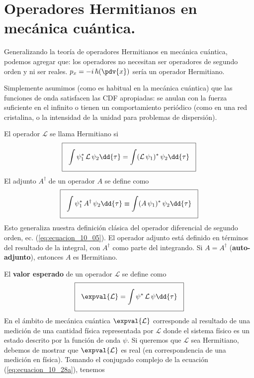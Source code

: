 \section{Operadores Hermitianos en mecánica cuántica.}
Generalizando la teoría de operadores Hermitianos en mecánica cuántica, podemos agregar que: los operadores no necesitan ser operadores de segundo orden y ni ser reales. $\displaystyle p_{x} = - i \, \hbar(\pdv{x})$ sería un operador Hermitiano.
\par
Simplemente asumimos (como es habitual en la mecánica cuántica) que las funciones de onda satisfacen las CDF apropiadas: se anulan con la fuerza suficiente en el infinito o tienen un comportamiento periódico (como en una red cristalina, o la intensidad de la unidad para problemas de dispersión). 
\par
El operador $\mathcal{L}$ se llama Hermitiano si
\begin{equation}
\setlength{\fboxsep}{3\fboxsep}\boxed{\int \psi_{1}^{*} \, \mathcal{L} \, \psi_{2} \dd{\tau} =  \int (\mathcal{L} \, \psi_{1})^{*} \, \psi_{2} \dd{\tau}}
\label{eq:ecuacion_10_26}
\end{equation}
El adjunto $A^{\dagger}$ de un operador $A$ se define como 
\begin{equation}
\setlength{\fboxsep}{3\fboxsep}\boxed{\int \psi_{1}^{*} \, A^{\dagger} \, \psi_{2} \dd{\tau} \equiv \int (A \, \psi_{1})^{*} \, \psi_{2} \dd{\tau}}
\label{eq:ecuacion_10_27}
\end{equation}
Esto generaliza nuestra definición clásica del operador diferencial de segundo orden, ec. (\ref{eq:ecuacion_10_05}). El operador adjunto está definido en términos del resultado de la integral, con $A^{\dagger}$ como parte del integrando. Si $A = A^{\dagger}$ (\textbf{auto-adjunto}), entonces $A$ es Hermitiano. %
\par
El \textbf{valor esperado} de un operador $\mathcal{L}$ se define como
\begin{equation}
\setlength{\fboxsep}{3\fboxsep}\boxed{\expval{\mathcal{L}} = \int \psi^{*} \, \mathcal{L} \, \psi \dd{\tau}}
\label{eq:ecuacion_10_28a}
\end{equation}
En el ámbito de mecánica cuántica $\expval{\mathcal{L}}$ corresponde al resultado de una medición de una cantidad física representada por $\mathcal{L}$ donde el sistema físico es un estado descrito por la función de onda $\psi$. Si queremos que $\mathcal{L}$ sea Hermitiano, debemos de mostrar que $\expval{\mathcal{L}}$ es real (en correspondencia de una medición en física). Tomando el conjugado complejo de la ecuación (\ref{eq:ecuacion_10_28a}), tenemos
